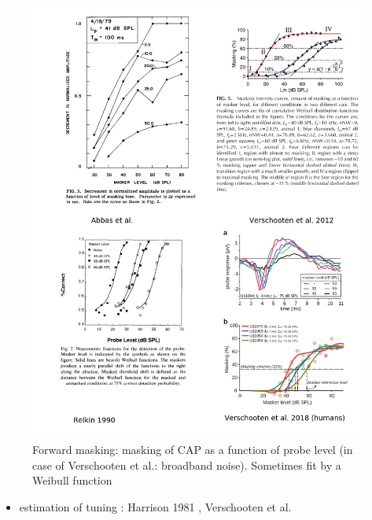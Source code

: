 \documentclass[]{article}
\providecommand{\tightlist}{%
  \setlength{\itemsep}{0pt}\setlength{\parskip}{0pt}}
\begin{document}
\begin{figure}
\centering
\includegraphics{./figures/forward_masking.png}
\caption{Forward masking: masking of CAP as a function of probe level
(in case of Verschooten et al.: broadband noise). Sometimes fit by a
Weibull function}
\end{figure}

\begin{itemize}
\tightlist
\item
  estimation of tuning : Harrison 1981
  \citep{Harrison1981, Harrison1981a}, Verschooten et al.
\end{itemize}

\clearpage


\end{document}
